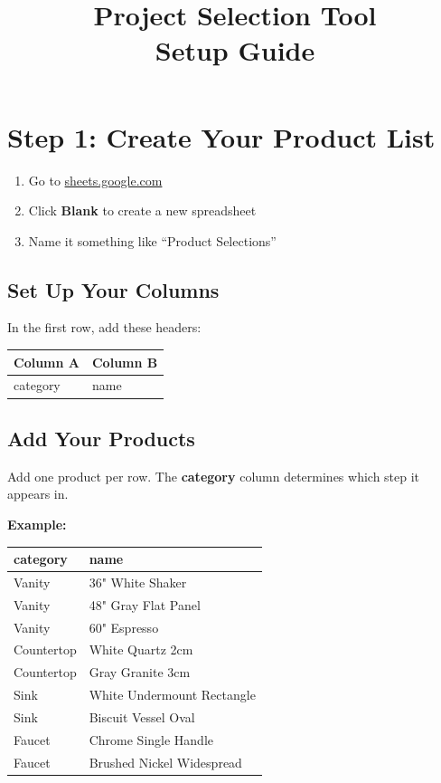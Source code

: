 \documentclass[11pt,letterpaper]{article}
\title{\textbf{Project Selection Tool}\\[0.5em]\large Setup Guide}
\author{}
\date{}
\begin{document}
\maketitle
\thispagestyle{fancy}

\section*{Step 1: Create Your Product List}

\begin{enumerate}[leftmargin=*]
    \item Go to \href{https://sheets.google.com}{sheets.google.com}
    \item Click \textbf{Blank} to create a new spreadsheet
    \item Name it something like ``Product Selections''
\end{enumerate}

\subsection*{Set Up Your Columns}

In the first row, add these headers:

\begin{center}
\begin{tabular}{ll}
\toprule
\textbf{Column A} & \textbf{Column B} \\
\midrule
category & name \\
\bottomrule
\end{tabular}
\end{center}

\subsection*{Add Your Products}

Add one product per row. The \textbf{category} column determines which step it appears in.

\textbf{Example:}

\begin{center}
\begin{tabular}{ll}
\toprule
\textbf{category} & \textbf{name} \\
\midrule
Vanity & 36" White Shaker \\
Vanity & 48" Gray Flat Panel \\
Vanity & 60" Espresso \\
Countertop & White Quartz 2cm \\
Countertop & Gray Granite 3cm \\
Sink & White Undermount Rectangle \\
Sink & Biscuit Vessel Oval \\
Faucet & Chrome Single Handle \\
Faucet & Brushed Nickel Widespread \\
\bottomrule
\end{tabular}
\end{center}
\end{document}
